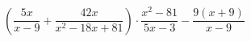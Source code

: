 \begin{ex}[type=expression]
	\begin{condition}
		\(\left( \dfrac{5x}{x-9}+\dfrac{42x}{x^2-18x+81} \right)\cdot\dfrac{x^2-81}{5x-3}-\dfrac{9(x+9)}{x-9}\)
	\end{condition}
\end{ex}